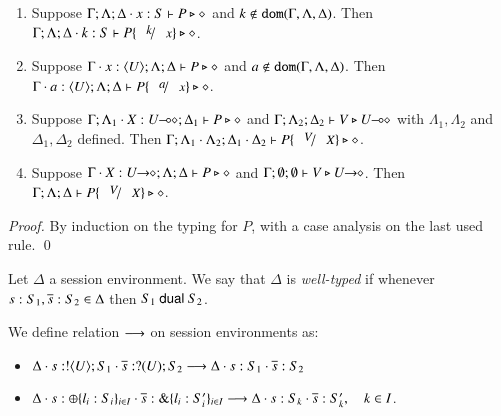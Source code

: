 \begin{lemma}\rm
	\label{lem:subst}
	\begin{enumerate}[1.]
		\item	Suppose $\Gamma; \Lambda; \Delta \cdot x:S  \vdash P \triangleright \diamond$ and
			$k \not\in \mathtt{dom}(\Gamma, \Lambda, \Delta)$. 
			Then $\Gamma; \Lambda; \Delta \cat k:S  \vdash P\subst{k}{x} \hastype \Proc$.

		\item	Suppose $\Gamma \cdot x:\langle U \rangle; \Lambda; \Delta \vdash P \triangleright \diamond$ and
			$a \notin \mathtt{dom}(\Gamma, \Lambda, \Delta)$. 
			Then $\Gamma \cat a:\chtype{U}; \Lambda; \Delta   \vdash P\subst{a}{x} \hastype \Proc$.

		\item	Suppose $\Gamma; \Lambda_1 \cdot X:U\!\! \multimap\!\! \diamond; \Delta_1  \vdash P \triangleright \diamond$ 
			and $\Gamma; \Lambda_2; \Delta_2  \vdash V \triangleright U\!\! \multimap\!\! \diamond$ with 
			$\Lambda_1, \Lambda_2$ and $\Delta_1, \Delta_2$ defined.  
			Then $\Gamma; \Lambda_1 \cat \Lambda_2; \Delta_1 \cat \Delta_2  \proves P\subst{V}{X} \hastype \Proc$.

		\item	Suppose $\Gamma \cdot X:U\!\! \rightarrow\!\! \diamond; \Lambda; \Delta  \vdash P \triangleright \diamond$ and
			$\Gamma; \emptyset ; \emptyset  \vdash V \triangleright U\!\! \rightarrow\!\! \diamond$.
			Then $\Gamma; \Lambda; \Delta  \proves P\subst{V}{X} \hastype \Proc$.
		\end{enumerate}
\end{lemma}

\begin{proof}
By induction on the typing for $P$, with a case analysis on the last used rule. 
\qed
\end{proof}

\begin{definition}\rm
	Let $\Delta$ a session environment.
	We say that $\Delta$ is {\em well-typed} if whenever
	$s: S_1, \overline{s}: S_2 \in \Delta$ then $S_1 \ \mathsf{dual}\  S_2$.
\end{definition}

\begin{definition}\rm
	We define relation $\longrightarrow$ on session environments as:
	\begin{itemize}
		\item	$\Delta \cdot s: ! \langle U \rangle ; S_1 \cdot \overline{s}: ? (U) ; S_2 \longrightarrow \Delta \cdot s: S_1 \cdot \overline{s}: S_2$
		\item	$\Delta \cdot s: \oplus \{l_i: S_i\}_{i \in I} \cdot \overline{s}: \& \{l_i: S_i'\}_{i \in I} \longrightarrow \Delta \cdot s: S_k \cdot \overline{s}: S_k', \quad k \in I$.
	\end{itemize}
\end{definition}

